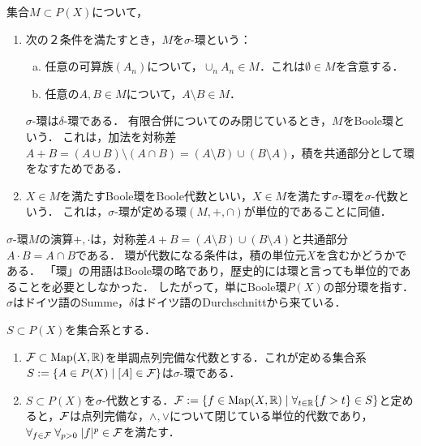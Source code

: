 \documentclass[uplatex,dvipdfmx]{jsreport}
\begin{document}
\begin{definition}
    集合$M\subset P(X)$について，
    \begin{enumerate}
        \item 次の２条件を満たすとき，$M$を$\sigma$-環という：
        \begin{enumerate}[(a)]
            \item 任意の可算族$(A_n)$について，$\cup_{n}A_n\in M$．これは$\emptyset\in M$を含意する．
            \item 任意の$A,B\in M$について，$A\setminus B\in M$．
        \end{enumerate}
        $\sigma$-環は$\delta$-環である．
        有限合併についてのみ閉じているとき，$M$をBoole環という．
        これは，加法を対称差$A+B=(A\cup B)\setminus(A\cap B)=(A\setminus B)\cup(B\setminus A)$，積を共通部分として環をなすためである．
        \item $X\in M$を満たすBoole環をBoole代数といい，$X\in M$を満たす$\sigma$-環を$\sigma$-代数という．
        これは，$\sigma$-環が定める環$(M,+,\cap)$が単位的であることに同値．
    \end{enumerate}
\end{definition}
\begin{remarks}
    $\sigma$-環$M$の演算$+,\cdot$は，対称差$A+B=(A\setminus B)\cup(B\setminus A)$と共通部分$A\cdot B=A\cap B$である．
    環が代数になる条件は，積の単位元$X$を含むかどうかである．
    「環」の用語はBoole環の略であり，歴史的には環と言っても単位的であることを必要としなかった．
    したがって，単にBoole環$P(X)$の部分環を指す．
    $\sigma$はドイツ語のSumme，$\delta$はドイツ語のDurchschnittから来ている．
\end{remarks}

\begin{lemma}\label{lemma-function-space-defined-by-measurable-sets}
    $S\subset P(X)$を集合系とする．
    \begin{enumerate}
        \item $\mathcal{F}\subset\mathrm{Map}(X,\mathbb{R})$を単調点列完備な代数とする．これが定める集合系$S:=\left\{A\in P(X)\mid [A]\in\mathcal{F}\right\}$は$\sigma$-環である．
        \item $S\subset P(X)$を$\sigma$-代数とする．$\mathcal{F}:=\left\{f\in\mathrm{Map}(X,\mathbb{R})\mid\forall_{t\in\mathbb{R}}\{f>t\}\in S\right\}$と定めると，$\mathcal{F}$は点列完備な，$\land,\lor$について閉じている単位的代数であり，$\forall_{f\in\mathcal{F}}\;\forall_{p>0}\;\lvert f\rvert^p\in\mathcal{F}$を満たす．
    \end{enumerate}
\end{lemma}
\end{document}
